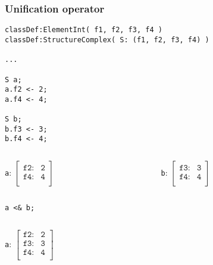 \documentclass[11pt]{beamer}
\begin{document}
\begin{frame}[fragile]
\frametitle{Unification operator}
\scriptsize
\begin{lstlisting}[language=lekta]
classDef:ElementInt( f1, f2, f3, f4 )
classDef:StructureComplex( S: (f1, f2, f3, f4) )

...

S a;
a.f2 <- 2;
a.f4 <- 4;

S b;
b.f3 <- 3;
b.f4 <- 4;
\end{lstlisting}
\small
\vspace{-10pt}
\begin{columns}
	\begin{column}{0.5\textwidth}
		\begin{center}
			\texttt{a}: $\begin{bmatrix}
																				\texttt{f2:}      & \texttt{2}\\ 
																				\texttt{f4:}     	& \texttt{4}\\ 
																			\end{bmatrix}$
		\end{center}
	\end{column}
	\begin{column}{0.5\textwidth}
		\begin{center}
			\texttt{b}: $\begin{bmatrix}
																				\texttt{f3:}      & \texttt{3}\\ 
																				\texttt{f4:}     	& \texttt{4}\\ 
																			\end{bmatrix}$
		\end{center}
	\end{column}
\end{columns}
\begin{center}
\texttt{a <\& b;}
\end{center}
\vspace{-30pt}
\begin{columns}
	\begin{column}{0.5\textwidth}
		\begin{center}
			\texttt{a}: $\begin{bmatrix}
																				\texttt{f2:}      & \texttt{2}\\ 
																				\texttt{f3:}      & \texttt{3}\\ 
																				\texttt{f4:}     	& \texttt{4}\\ 
																			\end{bmatrix}$

\end{center}
\end{column}
\end{columns}
\end{frame}
\end{document}
